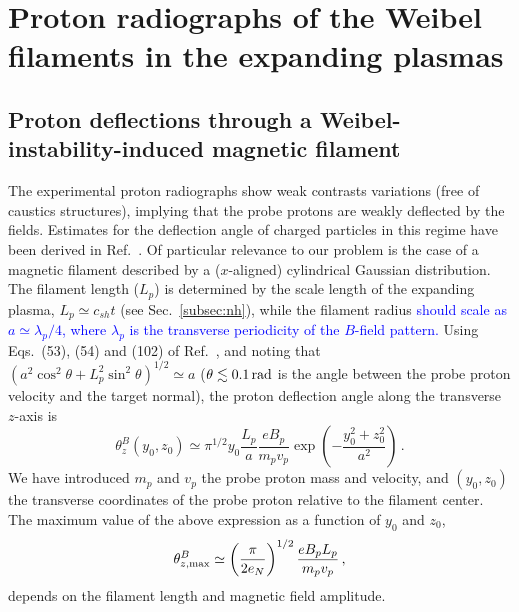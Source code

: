 \documentclass[aps,superscriptaddress]{revtex4}
\begin{document}
\section{Proton radiographs of the Weibel filaments in the expanding plasmas} 

\subsection{Proton deflections through a Weibel-instability-induced magnetic filament}

The experimental proton radiographs show weak contrasts variations (free of caustics structures), implying that the probe protons are weakly deflected by the fields. Estimates for the deflection angle of charged particles in this regime have been derived in Ref.~\cite{RSI_protograhyb}. Of particular relevance to our problem is the case of a magnetic filament described by a ($x$-aligned) cylindrical Gaussian distribution. The filament length ($L_p$) is determined by the scale length of the expanding plasma, $L_p \simeq c_{sh}t$ (see Sec.~\ref{subsec:nh}), while the filament radius \textcolor{blue}{should scale as $a \simeq \lambda_p/4$, where $\lambda_p$ is the transverse periodicity of the $B$-field pattern.} Using Eqs.~(53), (54) and (102) of Ref.~\cite{RSI_protograhyb}, and noting that $(a^2\cos^2\theta + L_p^2 \sin^2 \theta)^{1/2} \simeq a$ ($\theta \lesssim 0.1\,\rm rad$ is the angle between the probe proton velocity and the target normal), the proton deflection angle along the transverse $z$-axis is
\begin{equation}\label{eq:alphaphith}
\theta^B_z(y_0,z_0) \simeq \pi^{1/2} y_0 \frac{L_p}{a} \frac{e B_p }{m_p v_p} \exp\left(-\frac{y_0^2+z_0^2}{a^2} \right)\,.
\end{equation}
We have introduced $m_p$ and $v_p$ the probe proton mass and velocity, and $(y_0,z_0)$ the transverse coordinates of the probe proton relative to the filament center.
The maximum value of the above expression as a function of $y_0$ and $z_0$,
\begin{equation}
\theta_{z,\rm max}^B \simeq \left(\frac{\pi}{2e_N}\right)^{1/2}\frac{e B_p L_p}{m_p v_p} \,, \label{eq:alaphaphi}
\end{equation}
depends on the filament length and magnetic field amplitude.
\end{document}
